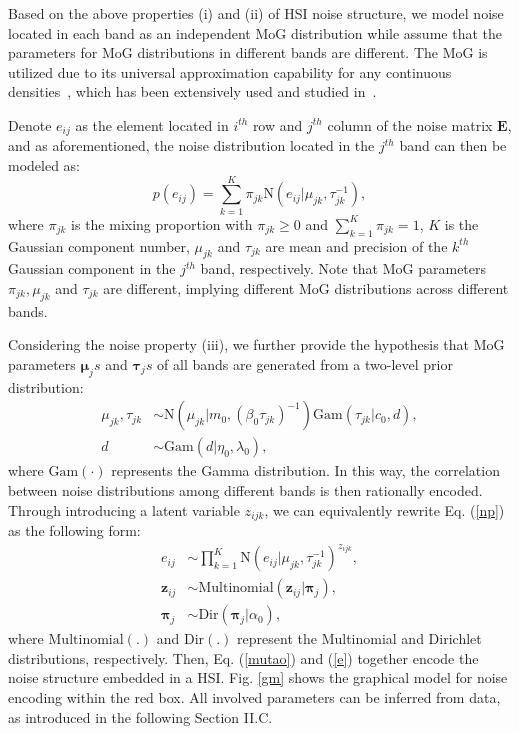 \documentclass[journal]{IEEEtran}
\begin{document}
Based on the above properties (i) and (ii) of HSI noise structure, we model noise located in each band as an independent MoG distribution while assume that the parameters for MoG distributions in different bands are different. The MoG is utilized due to its universal approximation capability for any continuous densities~\cite{maz1996approximate}, which has been extensively used and studied in~\cite{meng2013robust,zhao2014robust}.

Denote $ e_{ij}  $ as the element located in $ i^{th} $ row and $ j^{th} $ column of the noise matrix $ \bm{E} $, and as aforementioned, the noise distribution located in the $ j^{th} $ band can then be modeled as:
\begin{equation}\label{np}
p(e_{ij})=\sum_{k=1}^{K}{\pi_{jk} \mathrm{N}(e_{ij}|\mu_{jk},\tau_{jk}^{-1})},
\end{equation}
where $\pi_{jk}$ is the mixing proportion with $\pi_{jk} \geq 0$ and $ \sum_{k=1}^{K}{\pi_{jk}}=1 $, $ K $ is the Gaussian component number, $ \mu_{jk} $ and $ \tau_{jk} $ are mean and precision of the $ k^{th} $ Gaussian $ \mbox{component} $ in the $ j^{th} $ band, respectively. Note that MoG parameters $ \pi_{jk}, \mu_{jk}$
and $ \tau_{jk} $ are different, implying different MoG distributions across different bands.

Considering the noise property (iii), we further provide the hypothesis that MoG parameters $ \bm{\mu}_js $ and $ \bm{\tau}_js $ of all bands are generated from a two-level prior distribution:
\begin{equation}\label{mutao}
\begin{split}
\mu_{jk} ,\tau_{jk}&\sim \mathrm{N}(\mu_{jk}|m_0,(\beta_0\tau_{jk})^{-1}) \mathrm{Gam}(\tau_{jk}|c_0,d),\\
d & \sim \mathrm{Gam}(d|\eta_0,\lambda_0),
\end{split}
\end{equation}
where $ \mathrm{Gam}(\cdot) $ represents the Gamma distribution. In this way, the correlation between noise distributions among different bands is then rationally encoded. Through introducing a latent variable $ z_{ijk} $, we can equivalently rewrite Eq. (\ref{np}) as the following form:
\begin{equation}\label{e}
\begin{split}
e_{ij} &\sim \prod_{k=1}^K{\mathrm{N}(e_{ij}|\mu_{jk},\tau_{jk}^{-1})}^{z_{ijk}},\\
\bm{z}_{ij} &\sim \mathrm{Multinomial}(\bm{z}_{ij}|\bm{\pi}_j),\\ \bm{\pi}_j &\sim \mathrm{Dir}(\bm{\pi}_j|\alpha_0),
\end{split}
\end{equation}
where $ \mathrm{Multinomial}(.) $ and $ \mathrm{Dir}(.) $ represent the Multinomial and Dirichlet distributions, respectively.  Then, Eq. (\ref{mutao}) and (\ref{e}) together encode the noise structure embedded in a HSI. Fig. \ref{gm} shows the graphical model for noise encoding within the red box. All involved parameters can be inferred from data, as introduced in the following Section II.C.
\end{document}

